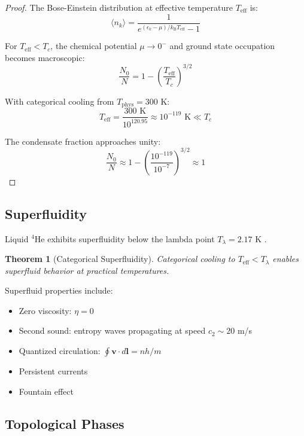 \documentclass[twocolumn,10pt,twoside]{article}
\newtheorem{theorem}{Theorem}[section]
\newcommand{\kb}{k_{\mathrm{B}}}
\newcommand{\Teff}{T_{\mathrm{eff}}}
\newcommand{\Tphys}{T_{\mathrm{phys}}}
\begin{document}
\begin{proof}
The Bose-Einstein distribution at effective temperature $\Teff$ is:
\begin{equation}
\langle n_k \rangle = \frac{1}{e^{(\epsilon_k - \mu)/\kb \Teff} - 1}
\end{equation}

For $\Teff < T_c$, the chemical potential $\mu \to 0^-$ and ground state occupation becomes macroscopic:
\begin{equation}
\frac{N_0}{N} = 1 - \left(\frac{\Teff}{T_c}\right)^{3/2}
\end{equation}

With categorical cooling from $\Tphys = 300$ K:
\begin{equation}
\Teff = \frac{300 \text{ K}}{10^{120.95}} \approx 10^{-119} \text{ K} \ll T_c
\end{equation}

The condensate fraction approaches unity:
\begin{equation}
\frac{N_0}{N} \approx 1 - \left(\frac{10^{-119}}{10^{-7}}\right)^{3/2} \approx 1
\end{equation}
\end{proof}

\subsection{Superfluidity}

Liquid $^4$He exhibits superfluidity below the lambda point $T_\lambda = 2.17$ K \cite{kapitza1938,allen1938}.

\begin{theorem}[Categorical Superfluidity]
\label{thm:superfluidity}
Categorical cooling to $\Teff < T_\lambda$ enables superfluid behavior at practical temperatures.
\end{theorem}

Superfluid properties include:
\begin{itemize}
    \item Zero viscosity: $\eta = 0$
    \item Second sound: entropy waves propagating at speed $c_2 \sim 20$ m/s
    \item Quantized circulation: $\oint \mathbf{v} \cdot d\mathbf{l} = nh/m$
    \item Persistent currents
    \item Fountain effect
\end{itemize}

\subsection{Topological Phases}
\end{document}
